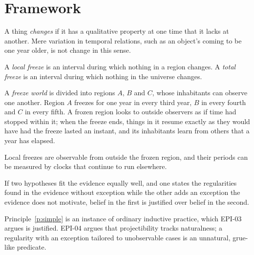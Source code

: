 \documentclass{situationist-preprint}
\begin{document}
\section{Framework}

\begin{definition}[Change]\label{d:change}
A thing \emph{changes} if it has a qualitative property at one time that it lacks at another. Mere variation in temporal relations, such as an object's coming to be one year older, is not change in this sense.
\end{definition}

\begin{definition}[Freeze]\label{d:freeze}
A \emph{local freeze} is an interval during which nothing in a region changes. A \emph{total freeze} is an interval during which nothing in the universe changes.
\end{definition}

\begin{definition}\label{d:world}
A \emph{freeze world} is divided into regions $A$, $B$ and $C$, whose inhabitants can observe one another. Region $A$ freezes for one year in every third year, $B$ in every fourth and $C$ in every fifth. A frozen region looks to outside observers as if time had stopped within it; when the freeze ends, things in it resume exactly as they would have had the freeze lasted an instant, and its inhabitants learn from others that a year has elapsed.
\end{definition}

\begin{assumption}\label{a:observable}
Local freezes are observable from outside the frozen region, and their periods can be measured by clocks that continue to run elsewhere.
\end{assumption}

\begin{principle}[Simplicity]\label{p:simple}
If two hypotheses fit the evidence equally well, and one states the regularities found in the evidence without exception while the other adds an exception the evidence does not motivate, belief in the first is justified over belief in the second.
\end{principle}

Principle~\ref{p:simple} is an instance of ordinary inductive practice, which EPI-03 argues is justified. EPI-04 argues that projectibility tracks naturalness; a regularity with an exception tailored to unobservable cases is an unnatural, grue-like predicate.
\end{document}

